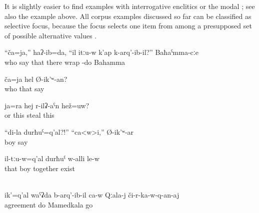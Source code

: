 It is slightly easier to find examples with interrogative enclitics  or the modal   ; see also the example  above. All corpus examples discussed so far can be classified as selective focus, because the focus selects one item from among a presupposed set of possible alternative values \citep[62]{Diketal1981}.
%
\begin{exe}
	\ex	\label{ex:I asked Bahama, who is it that is wrapped there}
	\gll	``ča=ja,''	haʔ-ib=da,	``il	itːu-w	k'ap	k-arq'-ib-il?'' Baħaˁmma-cːe\\
		who	say	that	there wrap	-do Bahamma\\
	\glt	{}

	\ex	\label{ex:Who is it who said this}
	\gll	ča=ja	hel	Ø-ik'ʷ-an?\\
		who	that	say\\
	\glt	{}

	\ex	\label{ex:‎‎Or is this her who is stealing}
	\gll	ja=ra	hej	r-ilʡ-aˁn	hež=uw?\\
		or	this	steal	this\\
	\glt	{}

	\ex	\label{ex:‎‎‎This is my son?!‎ ‎‎Yes, he says}
	\gll	``di-la	durħuˁ=q'al?!''	``ca<w>i,''	Ø-ik'ʷ-ar\\
			boy		say\\
	\glt	{}

	\ex	\label{ex:Here (i.e. on this picture) is it that the boy is together with them@26b}
	\gll	il-tːu-w=q'al	durħuˁ	w-alli	le-w\\
		that	boy	together	exist\\
	\glt	{}

	\\\label{ex:‎It was him himself who had agreed to get off (the car) in Kala (place name)}%
	\gll	ik'=q'al	waˁʡda	b-arq'-ib-il	ca-w	Qːala-j	či-r-ka-w-q-an-aj\\
			agreement	do		Mamedkala	go\\
	\glt	{}
\end{exe}

